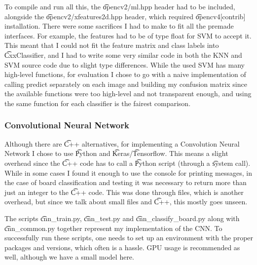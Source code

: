 To compile and run all this, the \t{opencv2/ml.hpp} header had to be included, alongside the \t{opencv2/xfeatures2d.hpp} header, which required \t{opencv4[contrib]} installation. There were some sacrifices I had to make to fit all the premade interfaces. For example, the features had to be of type float for SVM to accept it. This meant that I could not fit the feature matrix and class labels into \t{CxxClassifier}, and I had to write some very similar code in both the KNN and SVM source code due to slight type differences. While the used SVM has many high-level functions, for evaluation I chose to go with a naive implementation of calling predict separately on each image and building my confusion matrix since the available functions were too high-level and not transparent enough, and using the same function for each classifier is the fairest comparison.


\subsubsection{Convolutional Neural Network}

Although there are \t{C++} alternatives, for implementing a Convolution Neural Network I chose to use \t{Python} and \t{Keras}/\t{Tensorflow}. This means a slight overhead since the \t{C++} code has to call a \t{Python} script (through a \t{system} call). While in some cases I found it enough to use the console for printing messages, in the case of board classification and testing it was necessary to return more than just an integer to the \t{C++} code. This was done through files, which is another overhead, but since we talk about small files and \t{C++}, this mostly goes unseen.

The scripts \t{cnn\_train.py}, \t{cnn\_test.py} and \t{cnn\_classify\_board.py} along with \t{cnn\_common.py} together represent my implementation of the CNN. To successfully run these scripts, one needs to set up an environment with the proper packages and versions, which often is a hassle. GPU usage is recommended as well, although we have a small model here.


